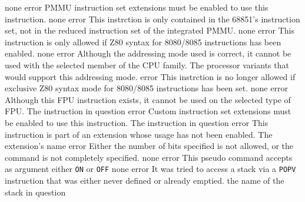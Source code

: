 \documentclass[12pt,twoside]{report}
\newcommand{\tty}[1]{{\tt #1}}
\begin{document}
\begin{description}
               {none}
               {error}
               {PMMU instruction set extensions must be enabled
                to use this instruction.}
               {none}
               {error}
               {This instrction is only contained in the 68851's
                instruction set, not in the reduced instruction
                set of the integrated PMMU.}
               {none}
               {error}
               {This instruction is only allowed if Z80 syntax
                for 8080/8085 instructions has been enabled.}
               {none}
               {error}
               {Although the addressing mode used is correct, it cannot be
                used with the selected member of the CPU family.}
               {The processor variants that would support this
                addressing mode.}
               {error}
               {This instrction is no longer allowed if exclusive
                Z80 syntax mode for 8080/8085 instructions has been set.}
               {none}
               {error}
               {Although this FPU instruction exists, it cannot be used on
                the selected type of FPU.}
               {The instruction in question}
               {error}
               {Custom instruction set extensions must be enabled
                to use this instruction.}
               {The instruction in question}
               {error}
               {This instruction is part of an extension whose
                usage has not been enabled.}
               {The extension's name}
               {error}
               {Either the number of bits specified is not allowed, or
                the command is not completely specified.}
               {none}
               {error}
               {This pseudo command accepts as argument either \tty{ON} or
                \tty{OFF}}
               {none}
               {error}
               {It was tried to access a stack via a \tty{POPV} instruction
                that was either never defined or already emptied.}
               {the name of the stack in question}

\end{description}
\end{document}
